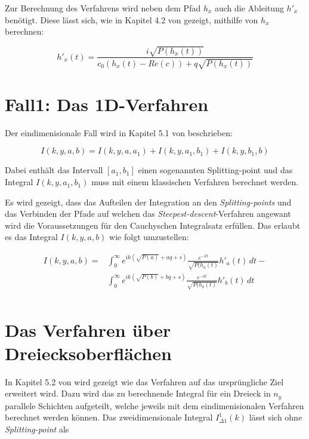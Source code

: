 Zur Berechnung des Verfahrens wird neben dem Pfad $h_x$ auch die Ableitung $h'_x$ benötigt.
Diese lässt sich, wie in Kapitel 4.2 von \cite{gasperini:hal-03209144} gezeigt, mithilfe von $h_x$ berechnen:

\begin{equation}
    h'_x(t) = \frac{i\sqrt{P(h_x(t))}}{c_0(h_x(t)-Re(c))+q\sqrt{P(h_x(t))}}
\end{equation}

\pagebreak

\section{Fall1: Das 1D-Verfahren}

Der eindimenisionale Fall wird in Kapitel 5.1 von \cite{gasperini:hal-03209144} beschrieben: 

\begin{equation}
    I(k,y,a,b) = I(k,y,a,a_1) + I(k,y,a_1, b_1) + I(k,y,b_1,b)
\end{equation}

Dabei enthält das Intervall $[a_1,b_1]$ einen sogenannten Splitting-point und das Integral $I(k,y,a_1,b_1)$ muss mit einem klassischen Verfahren berechnet werden.


Es wird gezeigt, dass das Aufteilen der Integration an den \textit{Splitting-points} und das Verbinden der Pfade auf welchen das \textit{Steepest-descent}-Verfahren angewant wird die Voraussetzungen für den Cauchyschen Integralsatz erfüllen.
Das erlaubt es das Integral $I(k,y,a,b)$ wie folgt umzustellen:

\begin{equation}
    \begin{aligned}
    I(k,y,a,b) =& \int_{0}^{\infty} e^{ik(\sqrt{P(a)} + aq +s)} \frac{e^{-kt}}{\sqrt{P(h_a(t)}} h'_a(t)\,dt -\\
    & \int_{0}^{\infty} e^{ik(\sqrt{P(b)} + bq +s)} \frac{e^{-kt}}{\sqrt{P(h_b(t)}} h'_b(t)\,dt \\
    \end{aligned}
\end{equation}

\section{Das Verfahren über Dreiecksoberflächen}

In Kapitel 5.2 von \cite*{gasperini:hal-03209144} wird gezeigt wie das Verfahren auf das ursprüngliche Ziel erweitert wird.
Dazu wird das zu berechnende Integral für ein Dreieck in $n_y$ parallele Schichten aufgeteilt, welche jeweils mit dem eindimenisionalen Verfahren berechnet werden können.
Das zweidimensionale Integral $I_{\Delta1}^1(k)$ lässt sich ohne \textit{Splitting-point} als

